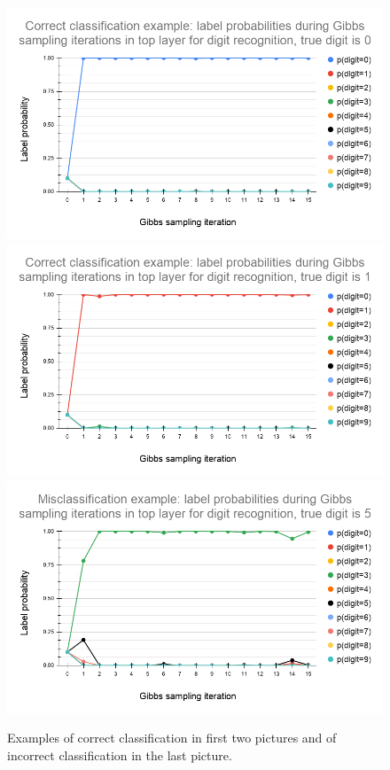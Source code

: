 \documentclass[a4paper]{article}
\begin{document}
\begin{figure}
    \centering
    \includegraphics[width=.9\linewidth]{img/4.2 Correct classification example label probabilities during Gibbs sampling iterations in top layer for digit recognition, true digit is 0.png}
    \includegraphics[width=.9\linewidth]{img/4.2 Correct classification example label probabilities during Gibbs sampling iterations in top layer for digit recognition, true digit is 1.png}
    \includegraphics[width=.9\linewidth]{img/4.2 Misclassification example label probabilities during Gibbs sampling iterations in top layer for digit recognition, true digit is 5.png}
    \caption{Examples of correct classification in first two pictures and of incorrect classification in the last picture.}
    \label{fig:correct_and_incorrect_classification}
\end{figure}
\end{document}
